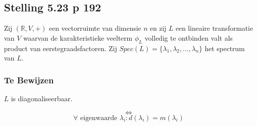 \documentclass[lineaire_algebra_oplossingen.tex]{subfiles}
\begin{document}
\subsection{Stelling 5.23 p 192}
Zij $(\mathbb{R},V,+)$ een vectorruimte van dimensie $n$ en zij $L$ een lineaire transformatie van $V$ waarvan de karakteristieke veelterm $\phi_L$ volledig te ontbinden valt als product van eerstegraadsfactoren. Zij $Spec(L) = \{\lambda_1,\lambda_2,...,\lambda_n\}$ het spectrum van $L$.

\subsubsection*{Te Bewijzen}
\begin{center}
$L$ is diagonaliseerbaar.
\end{center}
\[\Leftrightarrow\]
\[
\forall \text{ eigenwaarde } \lambda_i: d(\lambda_i) = m(\lambda_i)
\]
\end{document}
